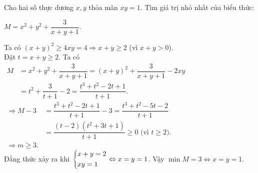 \begin{bt}%
	Cho hai số thực dương $x,y$ thỏa mãn $xy = 1$. Tìm giá trị nhỏ nhất của biểu thức:
	\begin{center}
		$M=x^2+y^2+\dfrac{3}{x+y+1}$.
	\end{center}
	\loigiai
	{Ta có $(x+y)^2\geq 4xy=4\Rightarrow x+y\geq 2 $ (vì $x+y>0$).\\
		Đặt $t=x+y\geq 2$. Ta có\\
		$\begin{array}{ll}
		M& = x^2+y^2+\dfrac{3}{x+y+1}=(x+y)^2+\dfrac{3}{x+y+1}-2xy \\ 
		& =t^2+\dfrac{3}{t+1}-2=\dfrac{t^3+t^2-2t+1}{t+1}.
		\end{array}$\\
		$\begin{array}{ll}
		\Rightarrow M-3 &=\dfrac{t^3+t^2-2t+1}{t+1}-3=\dfrac{t^3+t^2-5t-2}{t+1} \\
		&=\dfrac{(t-2)(t^2+3t+1)}{t+1}\geq 0  \text{ (vì }t\geq 2\text{)}.\\
		\Rightarrow m \ge 3.
		\end{array}$\\
		Đẳng thức xảy ra khi $\left\{\begin{aligned}&x+y=2\\&xy=1\end{aligned}\right.\Leftrightarrow x=y=1 $. Vậy $\min M=3\Leftrightarrow x=y=1.$    
	}
\end{bt}

